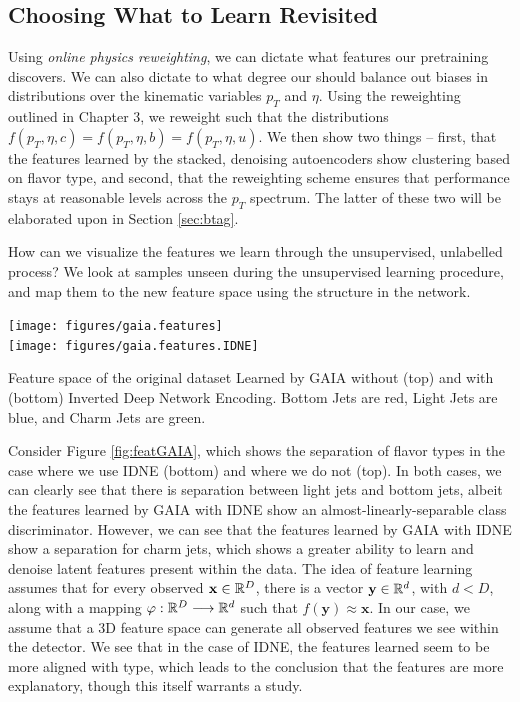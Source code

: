 \subsection{Choosing What to Learn Revisited}

Using \emph{online physics reweighting}, we can dictate what features our pretraining discovers. We can also dictate to what degree our \nn{} should balance out biases in distributions over the kinematic variables $p_T$ and $\eta$. Using the reweighting outlined in Chapter 3, we reweight such that the distributions $f(p_T, \eta, c)=f(p_T, \eta, b)=f(p_T, \eta, u)$. We then show two things -- first, that the features learned by the stacked, denoising autoencoders show clustering based on flavor type, and second, that the reweighting scheme ensures that performance stays at reasonable levels across the $p_T$ spectrum. The latter of these two will be elaborated upon in Section \ref{sec:btag}.

How can we visualize the features we learn through the unsupervised, unlabelled process? We look at samples unseen during the unsupervised learning procedure, and map them to the new feature space using the structure in the network. 

\begin{FPfigure}
\texttt{[image: figures/gaia.features]}\\
\texttt{[image: figures/gaia.features.IDNE]}
\caption[The ATLAS detector]{Feature space of the original dataset Learned by GAIA without (top) and with (bottom) Inverted Deep Network Encoding. Bottom Jets are red, Light Jets are blue, and Charm Jets are green.
\label{fig:featGAIA}}
\end{FPfigure}


Consider Figure \ref{fig:featGAIA}, which shows the separation of flavor types in the case where we use IDNE (bottom) and where we do not (top). In both cases, we can clearly see that there is separation between light jets and bottom jets, albeit the features learned by GAIA with IDNE show an almost-linearly-separable class discriminator. However, we can see that the features learned by GAIA with IDNE show a separation for charm jets, which shows a greater ability to learn and denoise latent features present within the data. The idea of feature learning assumes that for every observed  $\mathbf{x}\in\mathbb{R}^D$, there is a vector $\mathbf{y}\in\mathbb{R}^d$, with $d<D$, along with a mapping $\varphi:\mathbb{R}^D\longrightarrow\mathbb{R}^d$ such that $f(\mathbf{y}) \approx \mathbf{x}$. In our case, we assume that a 3D feature space can generate all observed features we see within the detector. We see that in the case of IDNE, the features learned seem to be more aligned with type, which leads to the conclusion that the features are more explanatory, though this itself warrants a study.

